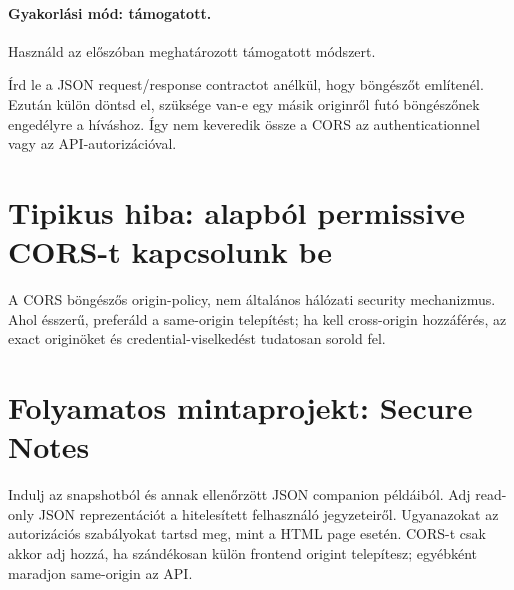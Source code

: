 \paragraph{Gyakorlási mód: támogatott.} Használd az előszóban meghatározott támogatott módszert.

Írd le a JSON request/response contractot anélkül, hogy böngészőt említenél. Ezután külön döntsd el, szüksége van-e egy másik originről futó böngészőnek engedélyre a híváshoz. Így nem keveredik össze a CORS az authenticationnel vagy az API-autorizációval.

\section{Tipikus hiba: alapból permissive CORS-t kapcsolunk be}
A CORS böngészős origin-policy, nem általános hálózati security mechanizmus. Ahol ésszerű, preferáld a same-origin telepítést; ha kell cross-origin hozzáférés, az exact originöket és credential-viselkedést tudatosan sorold fel.

\section{Folyamatos mintaprojekt: Secure Notes}
Indulj az  snapshotból és annak ellenőrzött JSON companion példáiból. Adj read-only JSON reprezentációt a hitelesített felhasználó jegyzeteiről. Ugyanazokat az autorizációs szabályokat tartsd meg, mint a HTML page esetén. CORS-t csak akkor adj hozzá, ha szándékosan külön frontend origint telepítesz; egyébként maradjon same-origin az API.
